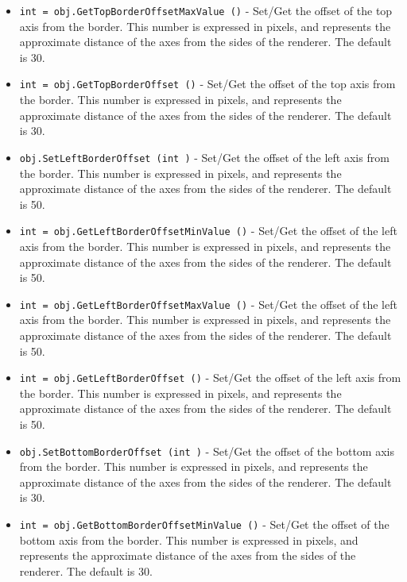 \begin{itemize}
\item  \verb|int = obj.GetTopBorderOffsetMaxValue ()| -  Set/Get the offset of the top axis from the border. This number is expressed in
 pixels, and represents the approximate distance of the axes from the sides
 of the renderer. The default is 30.

\item  \verb|int = obj.GetTopBorderOffset ()| -  Set/Get the offset of the top axis from the border. This number is expressed in
 pixels, and represents the approximate distance of the axes from the sides
 of the renderer. The default is 30.

\item  \verb|obj.SetLeftBorderOffset (int )| -  Set/Get the offset of the left axis from the border. This number is expressed in
 pixels, and represents the approximate distance of the axes from the sides
 of the renderer. The default is 50.

\item  \verb|int = obj.GetLeftBorderOffsetMinValue ()| -  Set/Get the offset of the left axis from the border. This number is expressed in
 pixels, and represents the approximate distance of the axes from the sides
 of the renderer. The default is 50.

\item  \verb|int = obj.GetLeftBorderOffsetMaxValue ()| -  Set/Get the offset of the left axis from the border. This number is expressed in
 pixels, and represents the approximate distance of the axes from the sides
 of the renderer. The default is 50.

\item  \verb|int = obj.GetLeftBorderOffset ()| -  Set/Get the offset of the left axis from the border. This number is expressed in
 pixels, and represents the approximate distance of the axes from the sides
 of the renderer. The default is 50.

\item  \verb|obj.SetBottomBorderOffset (int )| -  Set/Get the offset of the bottom axis from the border. This number is expressed in
 pixels, and represents the approximate distance of the axes from the sides
 of the renderer. The default is 30.

\item  \verb|int = obj.GetBottomBorderOffsetMinValue ()| -  Set/Get the offset of the bottom axis from the border. This number is expressed in
 pixels, and represents the approximate distance of the axes from the sides
 of the renderer. The default is 30.


\end{itemize}
